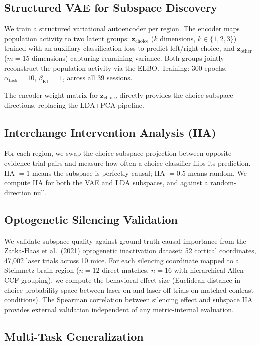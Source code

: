 \documentclass{article}
\begin{document}
\subsection{Structured VAE for Subspace Discovery}

We train a structured variational autoencoder \citep{narayanaswamy2017learning} per region. The encoder maps population activity to two latent groups: $\mathbf{z}_{\text{choice}}$ ($k$ dimensions, $k \in \{1,2,3\}$) trained with an auxiliary classification loss to predict left/right choice, and $\mathbf{z}_{\text{other}}$ ($m = 15$ dimensions) capturing remaining variance. Both groups jointly reconstruct the population activity via the ELBO. Training: 300 epochs, $\alpha_{\text{task}} = 10$, $\beta_{\text{KL}} = 1$, across all 39 sessions.

The encoder weight matrix for $\mathbf{z}_{\text{choice}}$ directly provides the choice subspace directions, replacing the LDA+PCA pipeline.

\subsection{Interchange Intervention Analysis (IIA)}

For each region, we swap the choice-subspace projection between opposite-evidence trial pairs and measure how often a choice classifier flips its prediction. IIA $= 1$ means the subspace is perfectly causal; IIA $= 0.5$ means random. We compute IIA for both the VAE and LDA subspaces, and against a random-direction null.

\subsection{Optogenetic Silencing Validation}

We validate subspace quality against ground-truth causal importance from the Zatka-Haas et al.\ (2021) optogenetic inactivation dataset: 52 cortical coordinates, 47,002 laser trials across 10 mice. For each silencing coordinate mapped to a Steinmetz brain region ($n = 12$ direct matches, $n = 16$ with hierarchical Allen CCF grouping), we compute the behavioral effect size (Euclidean distance in choice-probability space between laser-on and laser-off trials on matched-contrast conditions). The Spearman correlation between silencing effect and subspace IIA provides external validation independent of any metric-internal evaluation.

\subsection{Multi-Task Generalization}
\end{document}

